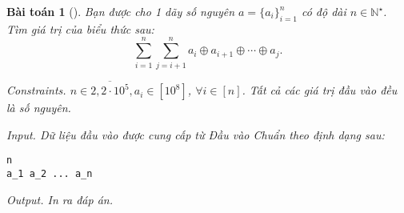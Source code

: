 \documentclass{article}
\newtheorem{baitoan}{Bài toán}
\begin{document}
\begin{baitoan}[]
    Bạn được cho 1 dãy số nguyên $a = \{a_i\}_{i=1}^n$ có độ dài $n\in\mathbb{N}^\star$. Tìm giá trị của biểu thức sau:
    \begin{equation*}
        \sum_{i=1}^n\sum_{j = i + 1}^n a_i\oplus a_{i+1}\oplus\cdots\oplus a_j.
    \end{equation*}
    \item {\sf Constraints.} $n\in\overline{2,2\cdot10^5}, a_i\in[10^8]$, $\forall i\in[n]$. Tất cả các giá trị đầu vào đều là số nguyên.
    \item {\sf Input.} Dữ liệu đầu vào được cung cấp từ Đầu vào Chuẩn theo định dạng sau:
    \begin{verbatim}
n
a_1 a_2 ... a_n
    \end{verbatim}
    \item {\sf Output.} In ra đáp án.
\end{baitoan}
\end{document}
